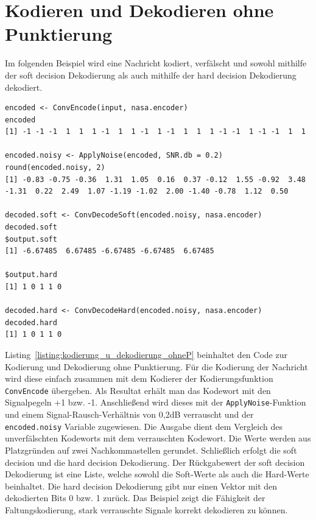 \section{Kodieren und Dekodieren ohne Punktierung}
\label{kapitel:beispiele_kodieren_ohneP}
Im folgenden Beispiel wird eine Nachricht kodiert, verfälscht und sowohl mithilfe der soft decision Dekodierung als auch mithilfe der hard decision Dekodierung dekodiert.
\begin{lstlisting}[caption=Kodierung und Dekodierung ohne Punktierung, label={listing:kodierung_u_dekodierung_ohneP}, float=!tbh]
encoded <- ConvEncode(input, nasa.encoder)
encoded
[1] -1 -1 -1  1  1  1 -1  1  1 -1  1 -1  1  1  1 -1 -1  1 -1 -1  1  1
 
encoded.noisy <- ApplyNoise(encoded, SNR.db = 0.2)
round(encoded.noisy, 2)
[1] -0.83 -0.75 -0.36  1.31  1.05  0.16  0.37 -0.12  1.55 -0.92  3.48 -1.31  0.22  2.49  1.07 -1.19 -1.02  2.00 -1.40 -0.78  1.12  0.50

decoded.soft <- ConvDecodeSoft(encoded.noisy, nasa.encoder)
decoded.soft
$output.soft
[1] -6.67485  6.67485 -6.67485 -6.67485  6.67485

$output.hard
[1] 1 0 1 1 0

decoded.hard <- ConvDecodeHard(encoded.noisy, nasa.encoder)
decoded.hard
[1] 1 0 1 1 0
\end{lstlisting}
Listing~\ref{listing:kodierung_u_dekodierung_ohneP} beinhaltet den Code zur Kodierung und Dekodierung ohne Punktierung. Für die Kodierung der Nachricht wird diese einfach zusammen mit dem Kodierer der Kodierungsfunktion \texttt{ConvEncode} übergeben. Als Resultat erhält man das Kodewort mit den Signalpegeln +1 bzw. -1. Anschließend wird dieses mit der \texttt{ApplyNoise}-Funktion und einem Signal-Rausch-Verhältnis von 0,2dB verrauscht und der \texttt{encoded.noisy} Variable zugewiesen. Die Ausgabe dient dem Vergleich des unverfälschten Kodeworts mit dem verrauschten Kodewort. Die Werte werden aus Platzgründen auf zwei Nachkommastellen gerundet. Schließlich erfolgt die soft decision und die hard decision Dekodierung. Der Rückgabewert der soft decision Dekodierung ist eine Liste, welche sowohl die Soft-Werte als auch die Hard-Werte beinhaltet. Die hard decision Dekodierung gibt nur einen Vektor mit den dekodierten Bits 0 bzw. 1 zurück. Das Beispiel zeigt die Fähigkeit der Faltungskodierung, stark verrauschte Signale korrekt dekodieren zu können.

